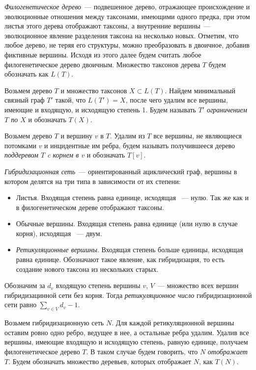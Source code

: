 \documentclass[14pt]{matmex-diploma-custom}
\begin{document}
    \textit{Филогенетическое дерево}~--- подвешенное дерево, отражающее происхождение и эволюционные отношения между таксонами, имеющими одного предка, при этом листья этого дерева отображают таксоны, а внутренние вершины~--- эволюционное явление разделения
    таксона на несколько новых. Отметим, что любое дерево, не теряя его структуры, можно преобразовать в двоичное, добавив фиктивные вершины. Исходя из этого далее будем считать
    любое филогенетическое дерево двоичным. Множество таксонов дерева $T$ будем обозначать как $L(T)$.
    
    Возьмем дерево $T$ и множество таксонов $X \subset L(T)$. Найдем минимальный связный граф $T'$ такой, что $L(T') = X$, после чего удалим все вершины, имеющие и входящую,
    и исходящую степень 1. Будем называть $T'$ \textit{ограничением $T$ по $X$} и обозначать
    $T(X)$.
    
    Возьмем дерево $T$ и вершину $v$ в $T$. Удалим из $T$ все вершины, не являющиеся потомками $v$ и инцидентные им ребра, будем называть получившееся дерево \textit{поддеревом $T$ c корнем в $v$} и обозначать $T[v]$.
    
    \textit{Гибридизационная сеть}~--- ориентированный ациклический граф, вершины в котором делятся на
    три типа в зависимости от их степени:
    \begin{itemize}
        \item Листья. Входящая степень равна единице, исходящая ~--- нулю. Так же как и в филогенетическом дереве отображают таксоны.
        \item Обычные вершины. Входящая степень равна единице (или нулю в случае корня), исходящая ~--- двум.
        \item \textit{Ретикуляционные вершины}. Входящая степень больше единицы, исходящая равна единице. Обозначают такое явление, как гибридизация, то есть создание нового таксона из нескольких старых.
    \end{itemize}
    
    
    Обозначим за $d_v$ входящую степень вершины $v$, $V$~--- множество всех вершин гибридизацинной сети без корня. Тогда \textit{ретикуляционное число} гибридизационной сети равно $\sum\limits_{v \in V} d_v - 1$.
    
    
    Возьмем гибридизационную сеть $N$. Для каждой ретикуляционной вершины оставим ровно
    одно ребро, ведущее в нее, а остальные ребра удалим. Удалив все вершины, имеющие
    входящую и исходящую степень, равную единице, получаем филогенетическое дерево $T$. В таком случае будем говорить, что $N$ \textit{отображает} $T$. Будем обозначать множество деревьев, которых отображает $N$, как $T(N)$.
    
\end{document}
